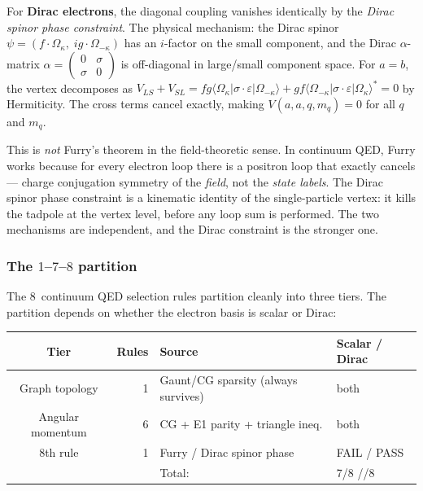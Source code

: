 \documentclass[11pt]{article}
\begin{document}
For \textbf{Dirac electrons}, the diagonal coupling vanishes identically
by the \emph{Dirac spinor phase constraint}.  The physical mechanism:
the Dirac spinor $\psi = (f \cdot \Omega_\kappa,\;
i g \cdot \Omega_{-\kappa})$ has an $i$-factor on the small component,
and the Dirac $\alpha$-matrix
$\alpha = \left(\begin{smallmatrix} 0 & \sigma \\ \sigma & 0
\end{smallmatrix}\right)$ is off-diagonal in large/small component space.
For $a = b$, the vertex decomposes as
$V_{LS} + V_{SL} = f g \langle \Omega_\kappa | \sigma \cdot \varepsilon
| \Omega_{-\kappa} \rangle + g f \langle \Omega_{-\kappa} |
\sigma \cdot \varepsilon | \Omega_\kappa \rangle^* = 0$
by Hermiticity.  The cross terms cancel exactly, making
$V(a, a, q, m_q) = 0$ for all $q$ and $m_q$.

This is \emph{not} Furry's theorem in the field-theoretic sense.  In
continuum QED, Furry works because for every electron loop there is a
positron loop that exactly cancels --- charge conjugation symmetry of
the \emph{field}, not the \emph{state labels}.  The Dirac spinor phase
constraint is a kinematic identity of the single-particle vertex: it
kills the tadpole at the vertex level, before any loop sum is
performed.  The two mechanisms are independent, and the Dirac constraint
is the stronger one.

\subsubsection{The $1$--$7$--$8$ partition}

The 8~continuum QED selection rules partition cleanly into three tiers.
The partition depends on whether the electron basis is scalar or Dirac:

\begin{center}
\begin{tabular}{crll}
\hline
Tier & Rules & Source & Scalar / Dirac \\
\hline
Graph topology & 1 & Gaunt/CG sparsity (always survives) & both \\
Angular momentum & 6 & CG + E1 parity + triangle ineq. & both \\
8th rule & 1 & Furry / Dirac spinor phase & FAIL / PASS \\
\hline
& & Total: & 7/8 \;\;/\;\; 8/8 \\
\hline
\end{tabular}
\end{center}
\end{document}
